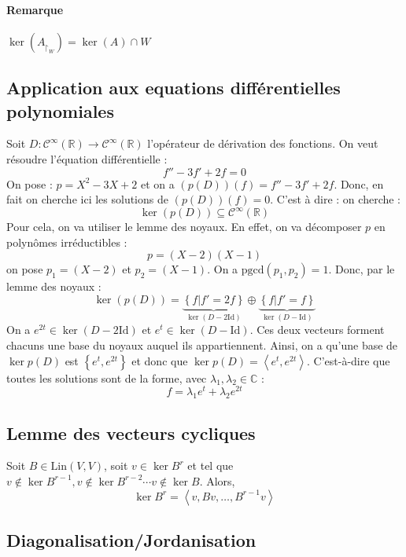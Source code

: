 \documentclass[a4paper,10pt]{article}
\newcommand{\ap}{ \rightarrow} %
\newcommand{\grp}[1]{\left\langle #1 \right\rangle} %
\newcommand{\set}[1]{\left\lbrace #1 \right\rbrace } %
\newcommand{\underb}[2]{\underset{ #1 }{\underbrace{ #2 }}} %
\newcommand{\RR}{\mathbb{R}} %
\newcommand{\CC}{\mathbb{C}} %
\newcommand{\pgcd}{\mathrm{pgcd}} %
\newcommand{\id}{\mathrm{Id}} %
\newcommand{\rstrct}[2]{{ #1 }_{\upharpoonright_{ #2 }}} %
\begin{document}
   \paragraph{Remarque} $\ker(\rstrct{A}{W}) = \ker(A) \cap W$

  \subsection{Application aux equations différentielles polynomiales}
   Soit $D:\mathcal{C}^{\infty}(\RR)\ap \mathcal{C}^{\infty}(\RR)$ l'opérateur de dérivation des fonctions. On veut résoudre l'équation différentielle :
    $$f''-3f'+2f=0$$
   On pose : $p=X^2-3X+2$ et on a $(p(D))(f)=f''-3f'+2f$. Donc, en fait on cherche ici les solutions de $(p(D))(f)=0$. C'est à dire : on cherche :
    $$\ker(p(D)) \subseteq \mathcal{C}^{\infty}(\RR)$$
   Pour cela, on va utiliser le lemme des noyaux. En effet, on va décomposer $p$ en polynômes irréductibles :
    $$p=(X-2)(X-1)$$
   on pose $p_1=(X-2)$ et $p_2=(X-1)$. On a $\pgcd(p_1,p_2)=1$. Donc, par le lemme des noyaux :
    $$\ker(p(D))=\underb{\ker(D-2\id)}{\set{f|f'=2f}} \oplus \underb{\ker(D-\id)}{\set{f|f'=f}}$$
   On a $e^{2t} \in \ker(D-2\id)$ et $e^t \in \ker(D-\id)$. Ces deux vecteurs forment chacuns une base du noyaux auquel ils appartiennent. Ainsi, on a qu'une base de $\ker p(D)$ est $\set{e^t,e^{2t}}$ et donc que $\ker p(D)=\grp{e^t,e^{2t}}$. C'est-à-dire que toutes les solutions sont de la forme, avec $\lambda_1, \lambda_2 \in \CC$ : $$f=\lambda_1 e^t+\lambda_2 e^{2t}$$

  \subsection{Lemme des vecteurs cycliques}
   Soit $B\in \mathrm{Lin}(V,V)$, soit $v \in \ker B^r$ et tel que $v \notin \ker B^{r-1}, v \notin \ker B^{r-2}  \cdots v \notin \ker B$. Alors,
    $$\ker B^r=\grp{v,Bv,\hdots,B^{r-1}v}$$
  
  \subsection{Diagonalisation/Jordanisation}
  \begin{comment}
   \subsubsection{Introduction}
    Soit $A$ une matrice d'application $K$-linéaire de $V_1\ap V_2$. On va chercher les vecteurs propres de l'application linéaire $A$, c'est-à-dire les vecteurs $v_{\lambda_i}$ tels que $Av_{\lambda_i}=\lambda_i v_{\lambda_i}$ avec $\lambda_i \in K$ la valeur propre associée à ces vecteurs. Cela veut dire que pour les vecteurs appartenant à l'espace propre $V_{\lambda_i}$, l'application de $A$ effectue une homothétie.\\
    Puis, on va exprimer l'application $A$ dans la base de ces vecteurs propres. Pour cela, il faut qu'il y ait autant de valeurs propres (et donc d'espace propres différents) que $\dim V_1=n$, sinon on ne peux pas faire une base avec ces vecteurs propres. ... %
  \end{comment}
\end{document}
